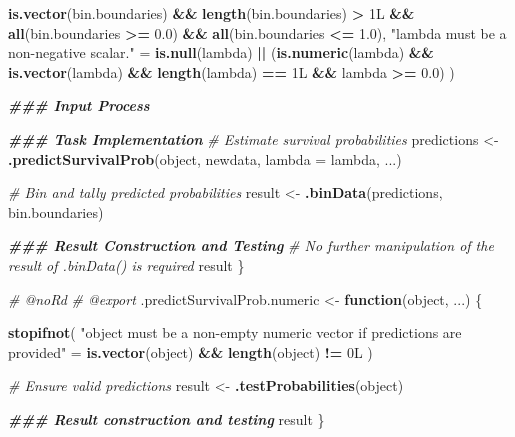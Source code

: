\documentclass[
]{book}
\newenvironment{Shaded}{\begin{snugshade}}{\end{snugshade}}
\newcommand{\AttributeTok}[1]{\textcolor[rgb]{0.13,0.29,0.53}{#1}}
\newcommand{\CommentTok}[1]{\textcolor[rgb]{0.56,0.35,0.01}{\textit{#1}}}
\newcommand{\ControlFlowTok}[1]{\textcolor[rgb]{0.13,0.29,0.53}{\textbf{#1}}}
\newcommand{\DocumentationTok}[1]{\textcolor[rgb]{0.56,0.35,0.01}{\textbf{\textit{#1}}}}
\newcommand{\FloatTok}[1]{\textcolor[rgb]{0.00,0.00,0.81}{#1}}
\newcommand{\FunctionTok}[1]{\textcolor[rgb]{0.13,0.29,0.53}{\textbf{#1}}}
\newcommand{\NormalTok}[1]{#1}
\newcommand{\OtherTok}[1]{\textcolor[rgb]{0.56,0.35,0.01}{#1}}
\newcommand{\SpecialCharTok}[1]{\textcolor[rgb]{0.81,0.36,0.00}{\textbf{#1}}}
\newcommand{\StringTok}[1]{\textcolor[rgb]{0.31,0.60,0.02}{#1}}
\begin{document}
\begin{Shaded}
\begin{Highlighting}[]
        \FunctionTok{is.vector}\NormalTok{(bin.boundaries) }\SpecialCharTok{\&\&} \FunctionTok{length}\NormalTok{(bin.boundaries) }\SpecialCharTok{\textgreater{}}\NormalTok{ 1L }\SpecialCharTok{\&\&} 
        \FunctionTok{all}\NormalTok{(bin.boundaries }\SpecialCharTok{\textgreater{}=} \FloatTok{0.0}\NormalTok{) }\SpecialCharTok{\&\&} \FunctionTok{all}\NormalTok{(bin.boundaries }\SpecialCharTok{\textless{}=} \FloatTok{1.0}\NormalTok{),}
    \StringTok{"\textasciigrave{}lambda\textasciigrave{} must be a non{-}negative scalar."} \OtherTok{=} 
      \FunctionTok{is.null}\NormalTok{(lambda) }\SpecialCharTok{||}\NormalTok{ (}\FunctionTok{is.numeric}\NormalTok{(lambda) }\SpecialCharTok{\&\&} \FunctionTok{is.vector}\NormalTok{(lambda) }\SpecialCharTok{\&\&}
                            \FunctionTok{length}\NormalTok{(lambda) }\SpecialCharTok{==}\NormalTok{ 1L }\SpecialCharTok{\&\&}\NormalTok{ lambda }\SpecialCharTok{\textgreater{}=} \FloatTok{0.0}\NormalTok{)}
\NormalTok{  )}
  
  \DocumentationTok{\#\#\# Input Process}
  
  \DocumentationTok{\#\#\# Task Implementation}
  \CommentTok{\# Estimate survival probabilities}
\NormalTok{  predictions }\OtherTok{\textless{}{-}} \FunctionTok{.predictSurvivalProb}\NormalTok{(object, newdata, }\AttributeTok{lambda =}\NormalTok{ lambda, ...)}

  \CommentTok{\# Bin and tally predicted probabilities}
\NormalTok{  result }\OtherTok{\textless{}{-}} \FunctionTok{.binData}\NormalTok{(predictions, bin.boundaries)}
  
  \DocumentationTok{\#\#\# Result Construction and Testing}
  \CommentTok{\# No further manipulation of the result of .binData() is required}
\NormalTok{  result}
\NormalTok{\}}

\CommentTok{\#\textquotesingle{} @noRd}
\CommentTok{\#\textquotesingle{} @export}
\NormalTok{.predictSurvivalProb.numeric }\OtherTok{\textless{}{-}} \ControlFlowTok{function}\NormalTok{(object, ...) \{}
  
  \FunctionTok{stopifnot}\NormalTok{(}
    \StringTok{"\textasciigrave{}object\textasciigrave{} must be a non{-}empty numeric vector if predictions are provided"} \OtherTok{=}
      \FunctionTok{is.vector}\NormalTok{(object) }\SpecialCharTok{\&\&} \FunctionTok{length}\NormalTok{(object) }\SpecialCharTok{!=}\NormalTok{ 0L}
\NormalTok{  )}
  
  \CommentTok{\# Ensure valid predictions}
\NormalTok{  result }\OtherTok{\textless{}{-}} \FunctionTok{.testProbabilities}\NormalTok{(object)}
  
  \DocumentationTok{\#\#\# Result construction and testing}
\NormalTok{  result}
\NormalTok{\}}
\end{Highlighting}
\end{Shaded}
\end{document}
